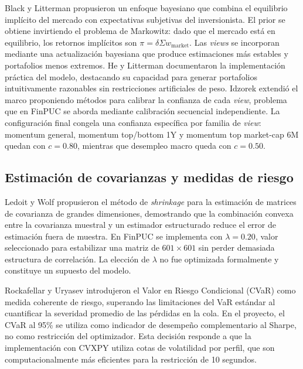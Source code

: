 Black y Litterman \cite{black1992} propusieron un enfoque bayesiano que
combina el equilibrio impl\'icito del mercado con expectativas subjetivas del
inversionista. El prior se obtiene invirtiendo el problema de Markowitz: dado
que el mercado est\'a en equilibrio, los retornos impl\'icitos son
$\pi = \delta \Sigma w_{\text{market}}$. Las \textit{views} se incorporan
mediante una actualizaci\'on bayesiana que produce estimaciones m\'as estables
y portafolios menos extremos. He y Litterman \cite{he1999} documentaron la
implementaci\'on pr\'actica del modelo, destacando su capacidad para generar
portafolios intuitivamente razonables sin restricciones artificiales de peso.
Idzorek \cite{idzorek2005} extendi\'o el marco proponiendo m\'etodos para
calibrar la confianza de cada \textit{view}, problema que en FinPUC se aborda
mediante calibraci\'on secuencial independiente. La configuraci\'on final
congela una confianza espec\'ifica por familia de \textit{view}: momentum
general, momentum top/bottom 1Y y momentum top market-cap 6M quedan con
$c=0.80$, mientras que desempleo macro queda con $c=0.50$.

\subsection{Estimaci\'on de covarianzas y medidas de riesgo}

Ledoit y Wolf \cite{ledoit2004} propusieron el m\'etodo de \textit{shrinkage}
para la estimaci\'on de matrices de covarianza de grandes dimensiones,
demostrando que la combinaci\'on convexa entre la covarianza muestral y un
estimador estructurado reduce el error de estimaci\'on fuera de muestra. En
FinPUC se implementa con $\lambda = 0.20$, valor seleccionado para
estabilizar una matriz de $601 \times 601$ sin perder demasiada estructura de
correlaci\'on. La elecci\'on de $\lambda$ no fue optimizada formalmente y
constituye un supuesto del modelo.

Rockafellar y Uryasev \cite{rockafellar2000} introdujeron el Valor en Riesgo
Condicional (CVaR) como medida coherente de riesgo, superando las limitaciones
del VaR est\'andar al cuantificar la severidad promedio de las p\'erdidas en
la cola. En el proyecto, el CVaR al 95\% se utiliza como indicador de
desempe\~no complementario al Sharpe, no como restricci\'on del optimizador.
Esta decisi\'on responde a que la implementaci\'on con CVXPY utiliza cotas de
volatilidad por perfil, que son computacionalmente m\'as eficientes para la
restricci\'on de 10 segundos.

